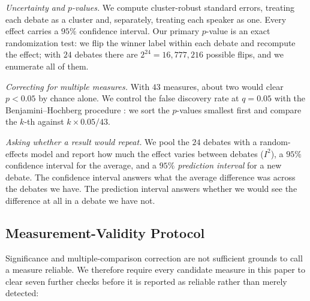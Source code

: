 \documentclass[journal]{IEEEtran}
\begin{document}
\emph{Uncertainty and $p$-values.} We compute cluster-robust standard
errors, treating each debate as a cluster and, separately, treating each
speaker as one. Every effect carries a $95\%$ confidence interval. Our
primary $p$-value is an exact randomization test: we flip the winner label
within each debate and recompute the effect; with $24$ debates there are
$2^{24} = 16{,}777{,}216$ possible flips, and we enumerate all of them.

\emph{Correcting for multiple measures.} With $43$ measures, about two would
clear $p < 0.05$ by chance alone. We control the false discovery rate at
$q = 0.05$ with the Benjamini--Hochberg procedure
\cite{benjamini1995controlling}: we sort the $p$-values smallest first and
compare the $k$-th against $k \times 0.05/43$.

\emph{Asking whether a result would repeat.} We pool the $24$ debates with a
random-effects model and report how much the effect varies between debates
($I^2$), a $95\%$ confidence interval for the average, and a $95\%$
\emph{prediction interval} for a new debate. The confidence interval answers
what the average difference was across the debates we have. The prediction
interval answers whether we would see the difference at all in a debate we
have not.

\subsection{Measurement-Validity Protocol}
\label{sec:method:validity}

Significance and multiple-comparison correction are not sufficient grounds to
call a measure reliable. We therefore require every candidate measure in this
paper to clear seven further checks before it is reported as reliable rather
than merely detected:
\end{document}
